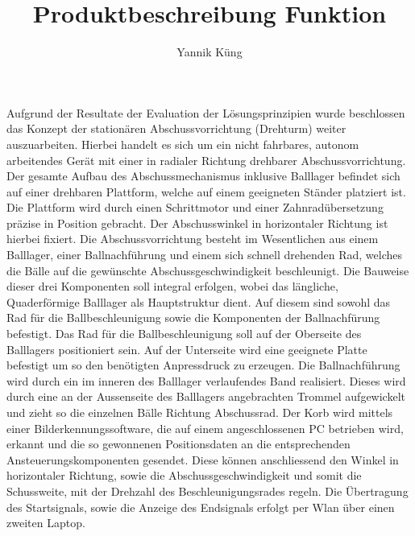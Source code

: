 \documentclass[a4paper,10pt,fleqn]{article}
\title{Produktbeschreibung Funktion}
\author{Yannik Küng}
\begin{document}
\maketitle
\clearpage
\tableofcontents
\clearpage

Aufgrund der Resultate der Evaluation der Lösungsprinzipien wurde beschlossen das Konzept der stationären Abschussvorrichtung (Drehturm) weiter auszuarbeiten. 
Hierbei handelt es sich um ein nicht fahrbares, autonom arbeitendes Gerät mit einer in radialer Richtung drehbarer Abschussvorrichtung. Der gesamte Aufbau des Abschussmechanismus inklusive Balllager befindet sich auf einer drehbaren Plattform, welche auf einem geeigneten Ständer platziert ist. Die Plattform wird durch einen Schrittmotor und einer Zahnradübersetzung präzise in Position gebracht. Der Abschusswinkel in horizontaler Richtung ist hierbei fixiert. 
Die Abschussvorrichtung besteht im Wesentlichen aus einem Balllager, einer Ballnachführung und einem sich schnell drehenden Rad, welches die Bälle auf die gewünschte Abschussgeschwindigkeit beschleunigt. Die Bauweise dieser drei Komponenten soll integral erfolgen, wobei das längliche, Quaderförmige Balllager als Hauptstruktur dient. Auf diesem sind sowohl das Rad für die Ballbeschleunigung sowie die Komponenten der Ballnachfürung befestigt.
Das Rad für die Ballbeschleunigung soll auf der Oberseite des Balllagers positioniert sein. Auf der Unterseite wird eine geeignete Platte befestigt um so den benötigten Anpressdruck zu erzeugen. 
Die Ballnachführung wird durch ein im inneren des Balllager verlaufendes Band realisiert. Dieses wird durch eine an der Aussenseite des Balllagers angebrachten Trommel aufgewickelt und zieht so die einzelnen Bälle Richtung Abschussrad.
Der Korb wird mittels einer Bilderkennungssoftware, die auf einem angeschlossenen PC betrieben wird, erkannt und die so gewonnenen Positionsdaten an die entsprechenden Ansteuerungskomponenten gesendet. Diese können anschliessend den Winkel in horizontaler Richtung, sowie die Abschussgeschwindigkeit und somit die Schussweite, mit der Drehzahl des Beschleunigungsrades regeln.
Die Übertragung des Startsignals, sowie die Anzeige des Endsignals erfolgt per Wlan über einen zweiten Laptop.



\clearpage

\clearpage

\clearpage

\clearpage

\clearpage

\clearpage

\clearpage

\end{document}
